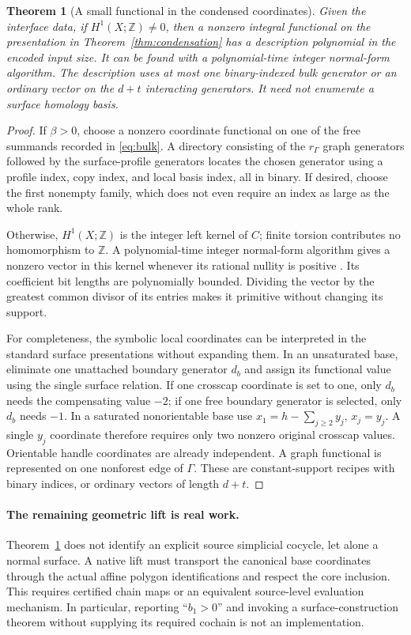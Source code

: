 \documentclass[11pt]{article}
\newtheorem{theorem}{Theorem}[section]
\theoremstyle{definition}
\theoremstyle{remark}
\newcommand{\Z}{\mathbb Z}
\begin{document}
\begin{theorem}[A small functional in the condensed coordinates]
\label{thm:functional}
Given the interface data, if $H^1(X;\Z)\ne0$, then a nonzero integral
functional on the presentation in Theorem~\ref{thm:condensation} has a
description polynomial in the encoded input size. It can be found with a
polynomial-time integer normal-form algorithm. The description uses at most
one binary-indexed bulk generator or an ordinary vector on the $d+t$
interacting generators. It need not enumerate a surface homology basis.
\end{theorem}
\begin{proof}
If $\beta>0$, choose a nonzero coordinate functional on one of the free
summands recorded in \eqref{eq:bulk}. A directory consisting of the
$r_\Gamma$ graph generators followed by the surface-profile generators
locates the chosen generator using a profile index, copy index, and local
basis index, all in binary. If desired, choose the first nonempty family,
which does not even require an index as large as the whole rank.

Otherwise, $H^1(X;\Z)$ is the integer left kernel of $C$; finite torsion
contributes no homomorphism to $\Z$. A polynomial-time integer normal-form
algorithm gives a nonzero vector in this kernel whenever its rational
nullity is positive \cite{kannan-bachem}. Its coefficient bit lengths are
polynomially bounded. Dividing the vector by the greatest common divisor
of its entries makes it primitive without changing its support.

For completeness, the symbolic local coordinates can be interpreted in the
standard surface presentations without expanding them. In an unsaturated
base, eliminate one unattached boundary generator $d_b$ and assign its
functional value using the single surface relation. If one crosscap
coordinate is set to one, only $d_b$ needs the compensating value $-2$;
if one free boundary generator is selected, only $d_b$ needs $-1$.
In a saturated nonorientable base use
$x_1=h-\sum_{j\geq2}y_j$, $x_j=y_j$. A single $y_j$ coordinate therefore
requires only two nonzero original crosscap values. Orientable handle
coordinates are already independent. A graph functional is represented on
one nonforest edge of $\Gamma$. These are constant-support recipes with
binary indices, or ordinary vectors of length $d+t$.
\end{proof}

\paragraph{The remaining geometric lift is real work.}
Theorem~\ref{thm:functional} does not identify an explicit source simplicial
cocycle, let alone a normal surface. A native lift must transport the
canonical base coordinates through the actual affine polygon identifications
and respect the core inclusion. This requires certified chain maps or an
equivalent source-level evaluation mechanism. In particular, reporting
``$b_1>0$'' and invoking a surface-construction theorem without supplying its
required cochain is not an implementation.
\end{document}
